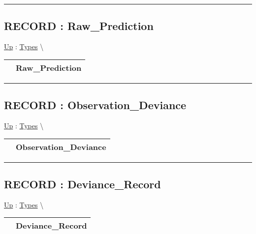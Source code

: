 \par


\rule{\linewidth}{0.5pt}
\subsection*{RECORD : Raw\_Prediction}
\hypertarget{ecldoc:logisticregression.types.raw_prediction}{}
\hyperlink{ecldoc:LogisticRegression.Types}{Up} :
\hspace{0pt} \hyperlink{ecldoc:LogisticRegression.Types}{Types} \textbackslash 

{\renewcommand{\arraystretch}{1.5}
\begin{tabularx}{\textwidth}{|>{\raggedright\arraybackslash}l|X|}
\hline
\hspace{0pt} & Raw\_Prediction \\
\hline
\end{tabularx}
}

\par


\rule{\linewidth}{0.5pt}
\subsection*{RECORD : Observation\_Deviance}
\hypertarget{ecldoc:logisticregression.types.observation_deviance}{}
\hyperlink{ecldoc:LogisticRegression.Types}{Up} :
\hspace{0pt} \hyperlink{ecldoc:LogisticRegression.Types}{Types} \textbackslash 

{\renewcommand{\arraystretch}{1.5}
\begin{tabularx}{\textwidth}{|>{\raggedright\arraybackslash}l|X|}
\hline
\hspace{0pt} & Observation\_Deviance \\
\hline
\end{tabularx}
}

\par


\rule{\linewidth}{0.5pt}
\subsection*{RECORD : Deviance\_Record}
\hypertarget{ecldoc:logisticregression.types.deviance_record}{}
\hyperlink{ecldoc:LogisticRegression.Types}{Up} :
\hspace{0pt} \hyperlink{ecldoc:LogisticRegression.Types}{Types} \textbackslash 

{\renewcommand{\arraystretch}{1.5}
\begin{tabularx}{\textwidth}{|>{\raggedright\arraybackslash}l|X|}
\hline
\hspace{0pt} & Deviance\_Record \\
\hline
\end{tabularx}
}

